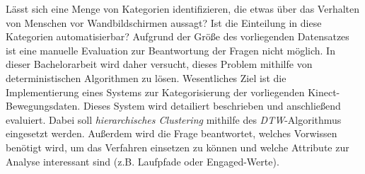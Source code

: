 Lässt sich eine Menge von Kategorien identifizieren, die etwas über das Verhalten von Menschen vor Wandbildschirmen aussagt?
Ist die Einteilung in diese Kategorien automatisierbar?
Aufgrund der Größe des vorliegenden Datensatzes ist eine manuelle Evaluation zur Beantwortung der Fragen nicht möglich.
In dieser Bachelorarbeit wird daher versucht, dieses Problem mithilfe von deterministischen Algorithmen zu lösen.
Wesentliches Ziel ist die Implementierung eines Systems zur Kategorisierung der vorliegenden Kinect-Bewegungsdaten.
Dieses System wird detailiert beschrieben und anschließend evaluiert.
Dabei soll \emph{hierarchisches Clustering} mithilfe des \emph{\ac{DTW}}-Algorithmus eingesetzt werden.
Außerdem wird die Frage beantwortet, welches Vorwissen benötigt wird,
um das Verfahren einsetzen zu können und welche Attribute zur Analyse interessant sind (z.B. Laufpfade oder Engaged-Werte).